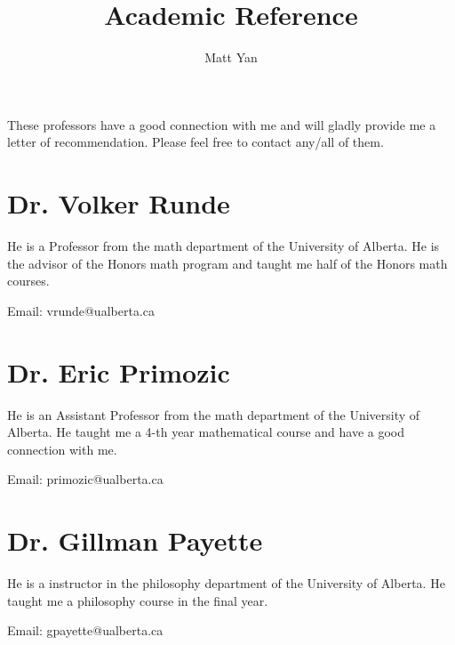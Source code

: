 \documentclass[11pt]{article}
\title{Academic Reference}
\author{Matt Yan}
\begin{document}
    \maketitle
    These professors have a good connection with me and will gladly provide me a letter of recommendation.
    Please feel free to contact any/all of them.

    \section*{Dr. Volker Runde}

    He is a Professor from the math department of the University of Alberta.
    He is the advisor of the Honors math program and taught me half of the Honors math courses.

    Email: vrunde@ualberta.ca

    \section*{Dr. Eric Primozic}

    He is an Assistant Professor from the math department of the University of Alberta.
    He taught me a 4-th year mathematical course and have a good connection with me.

    Email: primozic@ualberta.ca

    \section*{Dr. Gillman Payette}

    He is a instructor in the philosophy department of the University of Alberta.
    He taught me a philosophy course in the final year.

    Email: gpayette@ualberta.ca
\end{document}
